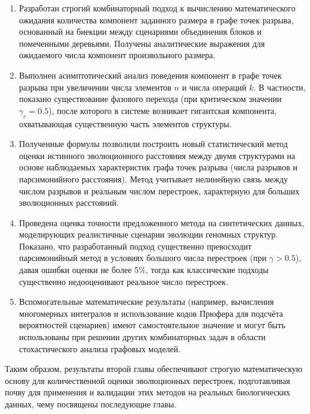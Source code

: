 \begin{enumerate}
    \item Разработан строгий комбинаторный подход к вычислению математического ожидания количества компонент заданного размера в графе точек разрыва, основанный на биекции между сценариями объединения блоков и помеченными деревьями. Получены аналитические выражения для ожидаемого числа компонент произвольного размера.

    \item Выполнен асимптотический анализ поведения компонент в графе точек разрыва при увеличении числа элементов $n$ и числа операций $k$. В частности, показано существование фазового перехода (при критическом значении $\gamma_c = 0.5$), после которого в системе возникает гигантская компонента, охватывающая существенную часть элементов структуры.

    \item Полученные формулы позволили построить новый статистический метод оценки истинного эволюционного расстояния между двумя структурами на основе наблюдаемых характеристик графа точек разрыва (числа разрывов и парсимонийного расстояния). Метод учитывает нелинейную связь между числом разрывов и реальным числом перестроек, характерную для больших эволюционных расстояний.

    \item Проведена оценка точности предложенного метода на синтетических данных, моделирующих реалистичные сценарии эволюции геномных структур. Показано, что разработанный подход существенно превосходит парсимонийный метод в условиях большого числа перестроек (при $\gamma > 0.5$), давая ошибки оценки не более 5\%, тогда как классические подходы существенно недооценивают реальное число перестроек.

    \item Вспомогательные математические результаты (например, вычисления многомерных интегралов и использование кодов Прюфера для подсчёта вероятностей сценариев) имеют самостоятельное значение и могут быть использованы при решении других комбинаторных задач в области стохастического анализа графовых моделей.

\end{enumerate}

Таким образом, результаты второй главы обеспечивают строгую математическую основу для количественной оценки эволюционных перестроек, подготавливая почву для применения и валидации этих методов на реальных биологических данных, чему посвящены последующие главы.
